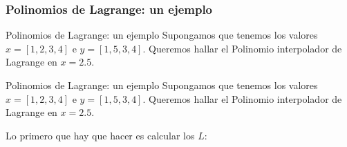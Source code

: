 \documentclass[xcolor=svgnames]{beamer} %
\theoremstyle{plain}
\theoremstyle{definition}
\begin{document}
\subsubsection{Polinomios de Lagrange: un ejemplo}

\begin{frame}{Polinomios de Lagrange: un ejemplo}
  Supongamos que tenemos los valores $x =[1, 2, 3, 4]$  e $y= [1, 5, 3, 4]$.
  Queremos hallar el Polinomio interpolador de Lagrange en $x = 2.5$.
  

\end{frame}

\begin{frame}{Polinomios de Lagrange: un ejemplo}
  Supongamos que tenemos los valores $x =[1, 2, 3, 4]$  e $y= [1, 5, 3, 4]$.
  Queremos hallar el Polinomio interpolador de Lagrange en $x = 2.5$.
  
  Lo primero que hay que hacer es calcular los $L$:
  \begin{minipage}{.45\linewidth}
  \end{minipage}		 \begin{minipage}{.45\linewidth}
  \end{minipage}
\end{frame}
\end{document}
